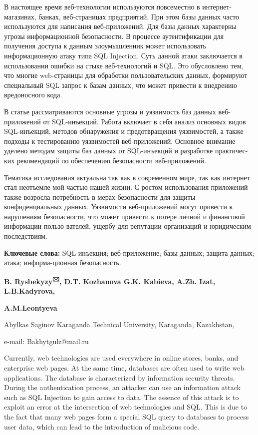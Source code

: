 В настоящее время веб-технологии используются повсеместно в
интернет-магазинах, банках, веб-страницах предприятий. При этом базы
данных часто используются для написания веб-приложений. Для базы данных
характерны угрозы информационной безопасности. В процессе аутентификации
для получения доступа к данным злоумышленник может использовать
информационную атаку типа SQL Injection. Суть данной атаки заключается в
использовании ошибки на стыке веб-технологий и SQL. Это обусловлено тем,
что многие web-страницы для обработки пользовательских данных, формируют
специальный SQL запрос к базам данных, что может привести к внедрению
вредоносного кода.

В статье рассматриваются основные угрозы и уязвимость баз данных
веб-приложений от SQL-инъекций. Работа включает в себя анализ основных
видов SQL-инъекций, методов обнаружения и предотвращения уязвимостей, а
также подходы к тестированию уязвимостей веб-приложений. Основное
внимание уделено методам защиты баз данных от SQL-инъекций и разработке
практичес-ких рекомендаций по обеспечению безопасности веб-приложений.

Тематика исследования актуальна так как в современном мире, так как
интернет стал неотъемле-мой частью нашей жизни. С ростом использования
приложений также возросла потребность в мерах безопасности для защиты
конфиденциальных данных. Уязвимости веб-приложений могут привести к
нарушениям безопасности, что может привести к потере личной и финансовой
информации пользо-вателей, ущербу для репутации организаций и юридическим
последствиям.

{\bfseries Ключевые слова:} SQL-инъекция; веб-приложение; базы данных;
защита данных; атака; информа-ционная безопасность.


\begin{center}
{\bfseries B. Rysbekyzy\textsuperscript{🖂}, D.T. Kozhanova G.K. Kabieva,
A.Zh. Izat, L.B.Kadyrova,}

{\bfseries A.M.Leontyeva}

Abylkas Saginov Karaganda Technical University, Karaganda, Kazakhstan,

e-mail: Bakhytgulz@mail.ru
\end{center}

Currently, web technologies are used everywhere in online stores, banks,
and enterprise web pages. At the same time, databases are often used to
write web applications. The database is characterized by information
security threats. During the authentication process, an attacker can use
an information attack such as SQL Injection to gain access to data. The
essence of this attack is to exploit an error at the intersection of web
technologies and SQL. This is due to the fact that many web pages form a
special SQL query to databases to process user data, which can lead to
the introduction of malicious code.

